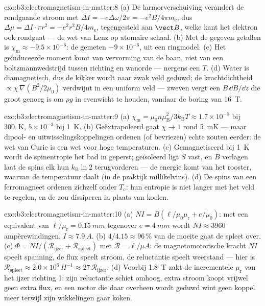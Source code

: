 \begin{solution}{exo:b3:electromagnetism-in-matter:8}
(a) De larmorverschuiving verandert de rondgaande stroom met $\Delta I
= -e\Delta\omega/2\pi = -e^2B/4\pi m_{\text{e}}$, dus
$\Delta\mu = \Delta I\cdot\pi r^2 = -e^2r^2B/4m_{\text{e}}$,
tegengesteld aan $\vect B$, welke kant het elektron ook rondgaat ---
de wet van Lenz op atomaire schaal. (b) Met de gegeven getallen is
$\chi_{\text{m}} \approx -9.5\times10^{-6}$: de gemeten
$-9\times10^{-6}$, uit een ringmodel. (c) Het geïnduceerde moment
komt van vervorming van de baan, niet van een boltzmannwedstrijd
tussen richting en wanorde --- nergens een $T$. (d) Water is
diamagnetisch, dus de kikker wordt naar zwak veld geduwd; de krachtdichtheid
$\propto \chi\,\nabla(B^2/2\mu_0)$ verdwijnt in een uniform
veld --- zweven vergt een $B\,\dd B/\dd z$ die groot genoeg is om
$\rho g$ in evenwicht te houden, vandaar de boring van \qty{16}{T}.
\end{solution}

\begin{solution}{exo:b3:electromagnetism-in-matter:9}
(a) $\chi_{\text{m}} = \mu_0n\mu_{\text{B}}^2/3k_{\text{B}}T
\approx 1.7\times10^{-5}$ bij \qty{300}{K}, $5\times10^{-3}$ bij
\qty{1}{K}. (b) Geëxtrapoleerd gaat $\chi \to 1$ rond \qty{5}{mK} ---
maar dipool- en uitwisselingskoppelingen ordenen (of bevriezen) echte zouten
eerder: de wet van Curie is een wet voor hoge temperaturen. (c) Gemagnetiseerd bij
\qty{1}{K} wordt de spinentropie het bad in geperst;
geïsoleerd ligt $S$ vast, en $B$ verlagen laat de spins elk hun
$k_{\text{B}}\ln 2$ terugvorderen --- de energie komt van het
rooster, waarvan de temperatuur daalt (in de praktijk millikelvins). (d)
De spins van een ferromagneet ordenen zichzelf onder $T_{\text{c}}$: hun
entropie is niet langer met het veld te regelen, en de  zou
dissiperen in plaats van koelen.
\end{solution}

\begin{solution}{exo:b3:electromagnetism-in-matter:10}
(a) $NI = B(\ell/\mu_0\mu_{\text{r}} + e/\mu_0)$: met
een equivalent van $\ell/\mu_{\text{r}} = \qty{0.15}{mm}$ tegenover $e =
\qty{4}{mm}$ wordt $NI \approx 3960$ ampèrewindingen, $I \approx
\qty{7.9}{A}$. (b) $4/4.15 \approx 96\,\%$ van de moeite gaat
de spleet over. (c) $\Phi = NI/(\mathcal R_{\text{ijzer}} +
\mathcal R_{\text{spleet}})$ met $\mathcal R = \ell/\mu A$:
de magnetomotorische kracht $NI$ speelt spanning, de flux speelt stroom,
de reluctantie speelt weerstand --- hier is $\mathcal R_{\text{spleet}}
\approx 2.0\times10^{6}\,\unit{H^{-1}} \approx
27\,\mathcal R_{\text{ijzer}}$. (d) Voorbij \qty{1.8}{T} zakt de
incrementele $\mu_{\text{r}}$ van het ijzer richting 1: zijn reluctantie
schiet omhoog, extra stroom koopt vrijwel geen extra flux, en een motor die daar
overheen wordt geduwd wint geen koppel meer terwijl zijn wikkelingen gaar koken.
\end{solution}

